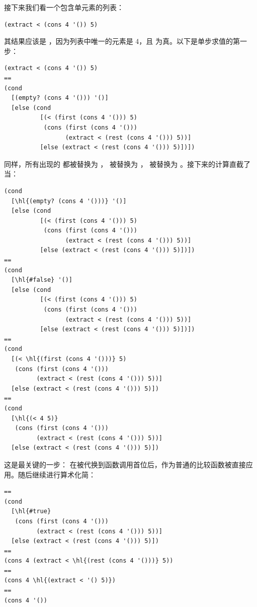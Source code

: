 接下来我们看一个包含单元素的列表：

\begin{lstlisting}[language=BSL]
(extract < (cons 4 '()) 5)
\end{lstlisting}

其结果应该是 ，因为列表中唯一的元素是 4，且  为真。以下是单步求值的第一步：

\begin{stepperbox}
\begin{Verbatim}[commandchars=\\\{\}, fontsize=\scriptsize]
(extract < (cons 4 '()) 5)
==
(cond
  [(empty? (cons 4 '())) '()]
  [else (cond
          [(< (first (cons 4 '())) 5)
           (cons (first (cons 4 '()))
                 (extract < (rest (cons 4 '())) 5))]
          [else (extract < (rest (cons 4 '())) 5)])])
\end{Verbatim}
\end{stepperbox}

同样，所有出现的  都被替换为 \code{<}， 被替换为 ， 被替换为 。接下来的计算直截了当：

\begin{stepperbox}
\begin{Verbatim}[commandchars=\\\{\}, fontsize=\scriptsize]
(cond
  [\hl{(empty? (cons 4 '()))} '()]
  [else (cond
          [(< (first (cons 4 '())) 5)
           (cons (first (cons 4 '()))
                 (extract < (rest (cons 4 '())) 5))]
          [else (extract < (rest (cons 4 '())) 5)])])
==
(cond
  [\hl{#false} '()]
  [else (cond
          [(< (first (cons 4 '())) 5)
           (cons (first (cons 4 '()))
                 (extract < (rest (cons 4 '())) 5))]
          [else (extract < (rest (cons 4 '())) 5)])])
==
(cond
  [(< \hl{(first (cons 4 '()))} 5)
   (cons (first (cons 4 '()))
         (extract < (rest (cons 4 '())) 5))]
  [else (extract < (rest (cons 4 '())) 5)])
==
(cond
  [\hl{(< 4 5)}
   (cons (first (cons 4 '()))
         (extract < (rest (cons 4 '())) 5))]
  [else (extract < (rest (cons 4 '())) 5)])
\end{Verbatim}
\end{stepperbox}

这是最关键的一步：\code{<} 在被代换到函数调用首位后，作为普通的比较函数被直接应用。随后继续进行算术化简：

\begin{stepperbox}
\begin{Verbatim}[commandchars=\\\{\}, fontsize=\footnotesize]
==
(cond
  [\hl{#true}
   (cons (first (cons 4 '()))
         (extract < (rest (cons 4 '())) 5))]
  [else (extract < (rest (cons 4 '())) 5)])
==
(cons 4 (extract < \hl{(rest (cons 4 '()))} 5))
==
(cons 4 \hl{(extract < '() 5)})
==
(cons 4 '())
\end{Verbatim}
\end{stepperbox}

